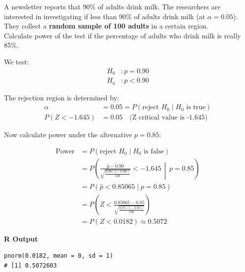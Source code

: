 \begin{example}
A newsletter reports that 90\% of adults drink milk. The researchers are interested in investigating if less than 90\% of adults drink milk (at $\alpha = 0.05$). They collect a \textbf{random sample of 100 adults} in a certain region. \\

Calculate power of the test if the percentage of adults who drink milk is really 85\%.


We test:
\begin{align*}
H_0 &: p = 0.90 \\
H_a &: p < 0.90
\end{align*}


The rejection region is determined by:
\begin{align*}
\alpha &= 0.05 = P(\text{reject } H_0 \mid H_0 \text{ is true}) \\
P(Z < -1.645) &= 0.05 \quad \text{(Z critical value is -1.645)}
\end{align*}

Now calculate power under the alternative $p = 0.85$:

\begin{align*}
\text{Power} &= P(\text{reject } H_0 \mid H_0 \text{ is false}) \\
&= P\left( \frac{\hat{p} - 0.90}{\sqrt{\frac{0.90(1 - 0.90)}{100}}} < -1.645 \,\middle|\, p = 0.85 \right) \\
&= P(\hat{p} < 0.85065 \mid p = 0.85) \\
&= P\left( Z < \frac{0.85065 - 0.85}{\sqrt{\frac{0.85(1 - 0.85)}{100}}} \right) \\
&= P(Z < 0.0182) \approx 0.5072
\end{align*}

\noindent\textbf{R Output}
\begin{tcolorbox}[colback=gray!10, colframe=black!45, arc=2mm]
\begin{verbatim}
pnorm(0.0182, mean = 0, sd = 1)
# [1] 0.5072603
\end{verbatim}
\end{tcolorbox}

\end{example}
